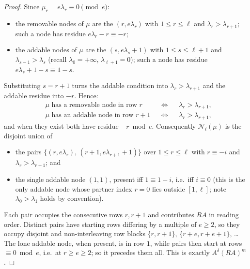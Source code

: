 \documentclass[11pt]{article}
\theoremstyle{plain}
\theoremstyle{definition}
\begin{document}
\begin{proof}
Since $\mu_r=e\lambda_r\equiv0\pmod e$:
\begin{itemize}
\item the removable nodes of $\mu$ are the $(r,e\lambda_r)$ with
  $1\le r\le\ell$ and $\lambda_r>\lambda_{r+1}$; such a node has residue
  $e\lambda_r-r\equiv-r$;
\item the addable nodes of $\mu$ are the $(s,e\lambda_s+1)$ with
  $1\le s\le\ell+1$ and $\lambda_{s-1}>\lambda_s$ (recall
  $\lambda_0=+\infty$, $\lambda_{\ell+1}=0$); such a node has residue
  $e\lambda_s+1-s\equiv1-s$.
\end{itemize}
Substituting $s=r+1$ turns the addable condition into
$\lambda_{r}>\lambda_{r+1}$ and the addable residue into $-r$.  Hence:
\begin{equation}\label{eq:Sr}
  \boxed{\begin{aligned}
  &\text{$\mu$ has a removable node in row $r$}
     &&\iff&& \lambda_r>\lambda_{r+1},\\
  &\text{$\mu$ has an addable node in row $r+1$}
     &&\iff&& \lambda_r>\lambda_{r+1},
  \end{aligned}}
\end{equation}
and when they exist both have residue $-r \bmod e$.  Consequently
$\mathcal{N}_i(\mu)$ is the disjoint union of
\begin{itemize}
\item the pairs $\{(r,e\lambda_r),\,(r+1,e\lambda_{r+1}+1)\}$ over
  $1\le r\le\ell$ with $r\equiv-i$ and $\lambda_r>\lambda_{r+1}$; and
\item the single addable node $(1,1)$, present iff $1\equiv1-i$, i.e.\ iff
  $i\equiv0$ (this is the only addable node whose partner index $r=0$ lies
  outside $[1,\ell]$; note $\lambda_0>\lambda_1$ holds by convention).
\end{itemize}
Each pair occupies the consecutive rows $r,r+1$ and contributes $RA$ in
reading order.  Distinct pairs have starting rows differing by a multiple of
$e\ge2$, so they occupy disjoint and non-interleaving row blocks
$\{r,r+1\}$, $\{r+e,r+e+1\}$, \dots  The lone addable node, when present, is
in row $1$, while pairs then start at rows $\equiv0\bmod e$, i.e.\ at
$r\ge e\ge2$; so it precedes them all.  This is exactly $A^\delta(RA)^m$.
\end{proof}
\end{document}
